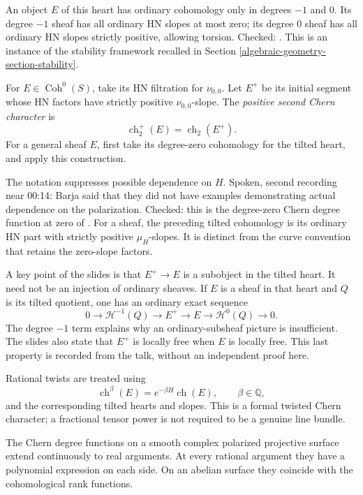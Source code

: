 An object $E$ of this heart has ordinary
cohomology only in degrees $-1$ and $0$.
Its degree $-1$ sheaf has all ordinary
HN slopes at most zero; its degree $0$
sheaf has all ordinary HN slopes strictly
positive, allowing torsion.
Checked:
\cite[Section 2, Remark 2.5]
{lahoz-rojas-chern-degree}.
This is an instance of the stability
framework recalled in Section
\ref{algebraic-geometry-section-stability}.

\begin{definition}
\label{definition-barja-positive-chern}
For $E\in\operatorname{Coh}^0(S)$, take
its HN filtration for $\nu_{0,0}$.
Let $E^+$ be its initial segment whose
HN factors have strictly positive
$\nu_{0,0}$-slope. The
\emph{positive second Chern character} is
$$
\operatorname{ch}_2^+(E)
=\operatorname{ch}_2(E^+).
$$
For a general sheaf $E$, first take its
degree-zero cohomology for the tilted
heart, and apply this construction.
\end{definition}

The notation suppresses possible dependence
on $H$. Spoken, second recording near
00:14: Barja said that they did not have
examples demonstrating actual dependence
on the polarization.
Checked: this is the degree-zero Chern
degree function at zero of
\cite[Definition 3.1]
{lahoz-rojas-chern-degree}.
For a sheaf, the preceding tilted
cohomology is its ordinary HN part with
strictly positive $\mu_H$-slopes.
It is distinct from the curve convention
that retains the zero-slope factors.

A key point of the slides is that
$E^+\to E$ is a subobject in the tilted
heart. It need not be an injection of
ordinary sheaves. If $E$ is a sheaf in
that heart and $Q$ is its tilted quotient,
one has an ordinary exact sequence
$$
0\to\mathcal H^{-1}(Q)\to E^+
\to E\to\mathcal H^0(Q)\to0.
$$
The degree $-1$ term explains why an
ordinary-subsheaf picture is insufficient.
The slides also state that $E^+$ is
locally free when $E$ is locally free.
This last property is recorded from the
talk, without an independent proof here.

Rational twists are treated using
$$
\operatorname{ch}^{\beta}(E)
=e^{-\beta H}\operatorname{ch}(E),
\qquad \beta\in\mathbb{Q},
$$
and the corresponding tilted hearts and
slopes. This is a formal twisted Chern
character; a fractional tensor power is
not required to be a genuine line bundle.

\begin{theorem}
\label{theorem-barja-chern-functions}
The Chern degree functions on a smooth
complex polarized projective surface
extend continuously to real arguments.
At every rational argument they have a
polynomial expression on each side.
On an abelian surface they coincide with
the cohomological rank functions.
\end{theorem}

